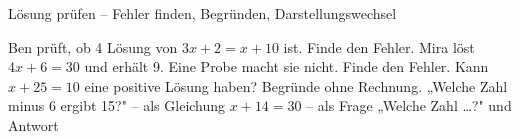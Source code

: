 \begin{aufgabe}{Lösung prüfen – Fehler finden, Begründen, Darstellungswechsel}
\begin{teile}
\teil Ben prüft, ob 4 Lösung von $3x + 2 = x + 10$ ist.  Finde den Fehler.
\teil Mira löst $4x + 6 = 30$ und erhält 9. Eine Probe macht sie nicht. Finde den Fehler.
\teil Kann $x + 25 = 10$ eine positive Lösung haben? Begründe ohne Rechnung.
\teil „Welche Zahl minus 6 ergibt 15?" – als Gleichung
\teil $x + 14 = 30$ – als Frage „Welche Zahl …?" und Antwort
\end{teile}
\end{aufgabe}

